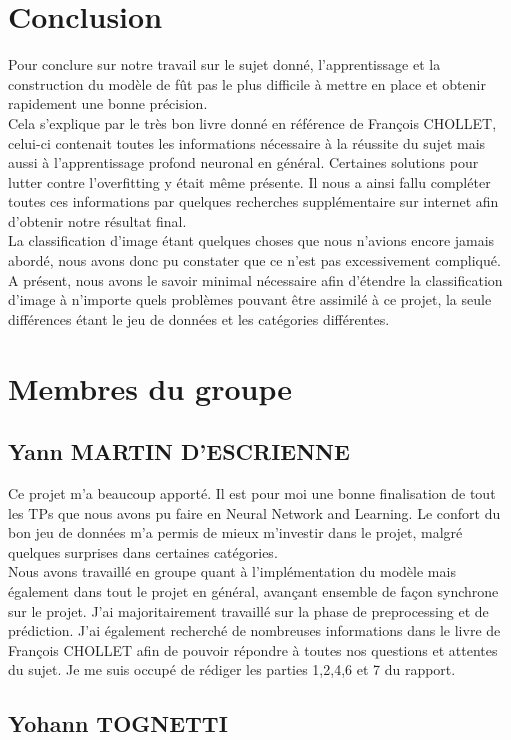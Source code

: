 \documentclass[12pt ,a4paper ]{article}
\begin{document}
\section{Conclusion}
Pour conclure sur notre travail sur le sujet donné, l'apprentissage et la construction du modèle de fût pas le plus difficile à mettre en place et obtenir rapidement une bonne précision. \\
Cela s'explique par le très bon livre donné en référence de François CHOLLET, celui-ci contenait toutes les informations nécessaire à la réussite du sujet mais aussi à l'apprentissage profond neuronal en général.  Certaines solutions pour lutter contre l'overfitting y était même présente. Il nous a ainsi fallu compléter toutes ces informations par quelques recherches supplémentaire sur internet afin d'obtenir notre résultat final.\\
La classification d'image étant quelques choses que nous n'avions encore jamais abordé, nous avons donc pu constater que ce n'est pas excessivement compliqué. A présent, nous avons le savoir minimal nécessaire afin d'étendre la classification d'image à n'importe quels problèmes pouvant être assimilé à ce projet, la seule différences étant le jeu de données et les catégories différentes. 

\section{Membres du groupe}
\subsection{Yann MARTIN D'ESCRIENNE}
Ce projet m'a beaucoup apporté. Il est pour moi une bonne finalisation de tout les TPs que nous avons pu faire en Neural Network and Learning. Le confort du bon jeu de données m'a permis de mieux m'investir dans le projet, malgré quelques surprises dans certaines catégories.\\

Nous avons travaillé en groupe quant à l'implémentation du modèle mais également dans tout le projet en général, avançant ensemble de façon synchrone sur le projet. J'ai majoritairement travaillé sur la phase de preprocessing et de prédiction. J'ai également recherché de nombreuses informations dans le livre de François CHOLLET afin de pouvoir répondre à toutes nos questions et attentes du sujet. 
Je me suis occupé de rédiger les parties 1,2,4,6 et 7 du rapport. 

\subsection{Yohann TOGNETTI}
\end{document}

